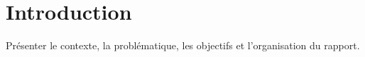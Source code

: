 \newpage
\chapter*{Introduction}
Présenter le contexte, la problématique, les objectifs et l'organisation du rapport.

